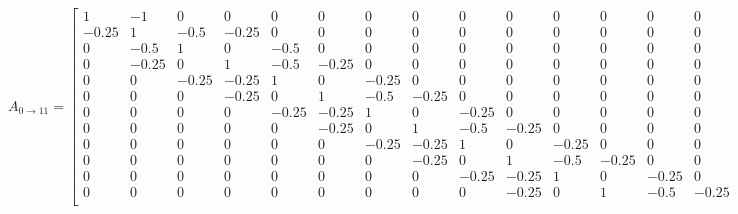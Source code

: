 \setcounter{MaxMatrixCols}{30}
\tiny
\[
A_{0 \rightarrow 11}=
  \begin{bmatrix}
1     & -1    & 0     & 0     & 0     & 0     & 0     & 0     & 0     & 0     & 0     & 0     & 0     & 0     & 0 &     \\
-0.25 & 1     & -0.5  & -0.25 & 0     & 0     & 0     & 0     & 0     & 0     & 0     & 0     & 0     & 0     & 0 &     \\
0     & -0.5  & 1     & 0     & -0.5  & 0     & 0     & 0     & 0     & 0     & 0     & 0     & 0     & 0     & 0 &      \\
0     & -0.25 & 0     & 1     & -0.5  & -0.25 & 0     & 0     & 0     & 0     & 0     & 0     & 0     & 0     & 0 &      \\
0     & 0     & -0.25 & -0.25 & 1     & 0     & -0.25 & 0     & 0     & 0     & 0     & 0     & 0     & 0     & 0 &      \\
0     & 0     & 0     & -0.25 & 0     & 1     & -0.5  & -0.25 & 0     & 0     & 0     & 0     & 0     & 0     & 0 & \dots     \\
0     & 0     & 0     & 0     & -0.25 & -0.25 & 1     & 0     & -0.25 & 0     & 0     & 0     & 0     & 0     & 0 &      \\
0     & 0     & 0     & 0     & 0     & -0.25 & 0     & 1     & -0.5  & -0.25 & 0     & 0     & 0     & 0     & 0 &      \\
0     & 0     & 0     & 0     & 0     & 0     & -0.25 & -0.25 & 1     & 0     & -0.25 & 0     & 0     & 0     & 0 &      \\
0     & 0     & 0     & 0     & 0     & 0     & 0     & -0.25 & 0     & 1     & -0.5  & -0.25 & 0     & 0     & 0 &      \\
0     & 0     & 0     & 0     & 0     & 0     & 0     & 0     & -0.25 & -0.25 & 1     & 0     & -0.25 & 0     & 0 &      \\
0     & 0     & 0     & 0     & 0     & 0     & 0     & 0     & 0     & -0.25 & 0     & 1     & -0.5  & -0.25 & 0 &      \\
  \end{bmatrix}
\]




